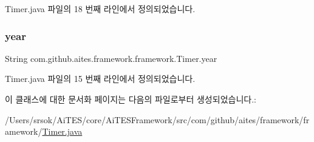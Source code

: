 Timer.\+java 파일의 18 번째 라인에서 정의되었습니다.

\mbox{\label{classcom_1_1github_1_1aites_1_1framework_1_1framework_1_1_timer_aa8703c39746c1952e9e969472d3beca4}} 
\subsubsection{\texorpdfstring{year}{year}}
{\footnotesize\ttfamily String com.\+github.\+aites.\+framework.\+framework.\+Timer.\+year\hspace{0.3cm}{\ttfamily [private]}}



Timer.\+java 파일의 15 번째 라인에서 정의되었습니다.



이 클래스에 대한 문서화 페이지는 다음의 파일로부터 생성되었습니다.\+:\begin{DoxyCompactItemize}
\item 
/\+Users/srsok/\+Ai\+T\+E\+S/core/\+Ai\+T\+E\+S\+Framework/src/com/github/aites/framework/framework/\mbox{\hyperlink{_timer_8java}{Timer.\+java}}\end{DoxyCompactItemize}
